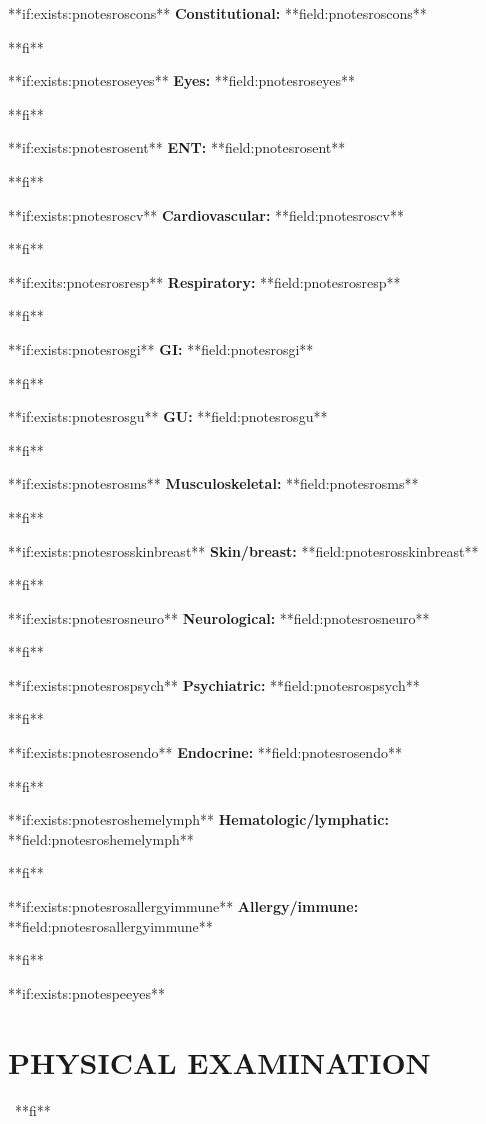 \documentclass{article}
\newcommand{\sheading}[1]{\textbf{#1:}}
\begin{document}
**if:exists:pnotesroscons**
\sheading{Constitutional} **field:pnotesroscons**
\par
**fi**

**if:exists:pnotesroseyes**
\sheading{Eyes} **field:pnotesroseyes**
\par
**fi**

**if:exists:pnotesrosent**
\sheading{ENT} **field:pnotesrosent**
\par
**fi**

**if:exists:pnotesroscv**
\sheading{Cardiovascular} **field:pnotesroscv**
\par
**fi**

**if:exits:pnotesrosresp**
\sheading{Respiratory}  **field:pnotesrosresp**
\par
**fi**


**if:exists:pnotesrosgi**
\sheading{GI} **field:pnotesrosgi**
\par
**fi**

**if:exists:pnotesrosgu**
\sheading{GU} **field:pnotesrosgu**
\par
**fi**

**if:exists:pnotesrosms**
\sheading{Musculoskeletal} **field:pnotesrosms**
\par
**fi**

**if:exists:pnotesrosskinbreast**
\sheading{Skin/breast} **field:pnotesrosskinbreast**
\par
**fi**

**if:exists:pnotesrosneuro**
\sheading{Neurological} **field:pnotesrosneuro**
\par
**fi**

**if:exists:pnotesrospsych**
\sheading{Psychiatric} **field:pnotesrospsych**
\par
**fi**

**if:exists:pnotesrosendo**
\sheading{Endocrine} **field:pnotesrosendo**
\par
**fi**

**if:exists:pnotesroshemelymph**
\sheading{Hematologic/lymphatic} **field:pnotesroshemelymph**
\par
**fi**

**if:exists:pnotesrosallergyimmune**
\sheading{Allergy/immune} **field:pnotesrosallergyimmune**
\par
**fi**

**if:exists:pnotespeeyes**
\
\section {PHYSICAL EXAMINATION}
\par
\
**fi**
\end{document}
